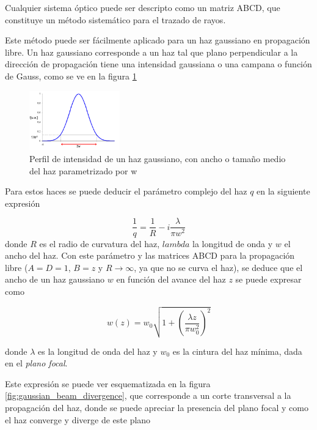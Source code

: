 Cualquier sistema óptico puede ser descripto como un matriz ABCD, que constituye un método sistemático para el trazado de rayos.

Este método puede ser fácilmente aplicado para un haz gaussiano en propagación libre. Un haz gaussiano corresponde a un haz tal que plano perpendicular a la dirección de propagación tiene una intensidad gaussiana o una campana o función de Gauss, como se ve en la figura \ref{fig:gaussian_beam_profile}

\begin{figure}[H]
\centering
\includegraphics[width=0.35\textwidth]{fig/gaussian_beam_profile}
\caption{Perfil de intensidad de un haz gaussiano, con ancho o tamaño medio del haz parametrizado por w}
\label{fig:gaussian_beam_profile}
\end{figure}

Para estos haces se puede deducir el parámetro complejo del haz $q$ en la siguiente expresión \cite{svelto} 

\begin{equation}
    \frac{1}{q} = \frac{1}{R} - i \frac{\lambda}{\pi w^2}
    \label{eq:perfilacion/beam_parameter}
\end{equation}
donde $R$ es el radio de curvatura del haz, $lambda$ la longitud de onda y $w$ el ancho del haz. Con este parámetro y las matrices ABCD para la propagación libre ($A=D=1$, $B=z$ y $R\to\infty$, ya que no se curva el haz), se deduce que el ancho de un haz gaussiano $w$ en función del avance del haz $z$ se puede expresar como

\begin{equation}
    w(z) = w_0 \sqrt{1 + \left(\frac{\lambda z}{\pi w_0^2}\right)^2}
    \label{eq:perfilacion/gauss_divergence}
\end{equation}

donde $\lambda$ es la longitud de onda del haz y $w_0$ es la cintura del haz mínima, dada en el \emph{plano focal}. 

Este expresión se puede ver esquematizada en la figura \ref{fig:gaussian_beam_divergence}, que corresponde a un corte transversal a la propagación del haz, donde se puede apreciar la presencia del plano focal y como el haz converge y diverge de este plano

